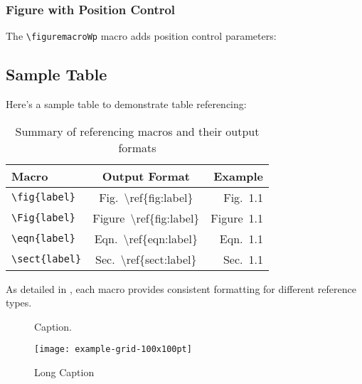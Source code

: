 \subsubsection{Figure with Position Control}
The \texttt{\textbackslash figuremacroWp} macro adds position control parameters:


\subsection{Sample Table}
\label{sect:sampletable}

Here's a sample table to demonstrate table referencing:

\begin{table}[h]
\centering
\begin{tabular}{|l|c|r|}
\hline
\textbf{Macro} & \textbf{Output Format} & \textbf{Example} \\
\hline
\texttt{\textbackslash fig\{label\}} & Fig.~\textbackslash ref\{fig:label\} & Fig.~1.1 \\
\texttt{\textbackslash Fig\{label\}} & Figure~\textbackslash ref\{fig:label\} & Figure~1.1 \\
\texttt{\textbackslash eqn\{label\}} & Eqn.~\textbackslash ref\{eqn:label\} & Eqn.~1.1 \\
\texttt{\textbackslash sect\{label\}} & Sec.~\textbackslash ref\{sect:label\} & Sec.~1.1 \\
\hline
\end{tabular}
\caption{Summary of referencing macros and their output formats}
\label{tabl:sampletable}
\end{table}

As detailed in , each macro provides consistent formatting for different reference types.

\begin{figure}[p]
\centering
\def\svgwidth{0.8\columnwidth}

	\caption[TOC title]{Caption.}
	\label{fig:MCFgeometry}
\end{figure}

\begin{figure}[p]
	\centering
	\texttt{[image: example-grid-100x100pt]}
	\caption[TOC Title]{Long Caption}
	\label{fig:simulated tiger}
\end{figure}







